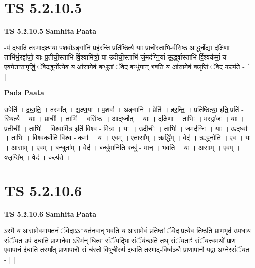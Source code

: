 \documentclass[17pt]{extarticle}
\begin{document}

\section{ TS 5.2.10.5 }

\textbf{TS 5.2.10.5 } \newline
\textbf{Samhita Paata} \newline

-प॑ दधाति॒ तस्मा॑दक्ष्ण॒या प॒शवोऽङ्गा॑नि॒ प्रह॑रन्ति॒ प्रति॑ष्ठित्यै॒ याः प्राची॒स्ताभि॒-र्वसि॑ष्ठ आर्द्ध्नो॒द्या द॑क्षि॒णा ताभि॑र्भ॒रद्वा॑जो॒ याः प्र॒तीची॒स्ताभि॑ र्वि॒श्वामि॑त्रो॒ या उदी॑ची॒स्ताभि॑-र्ज॒मद॑ग्नि॒र्या ऊ॒र्द्ध्वास्ताभि॑-र्वि॒श्वक॑र्मा॒ य ए॒वमे॒तासा॒मृद्धिं॒ ॅवेद॒र्द्ध्नोत्ये॒व य आ॑सामे॒वं ब॒न्धुतां॒ ॅवेद॒ बन्धु॑मान् भवति॒ य आ॑सामे॒वं क्लृप्तिं॒ ॅवेद॒ कल्प॑ते - [  ] \newline

\textbf{Pada Paata} \newline

उपेति॑ । द॒धा॒ति॒ । तस्मा᳚त् । अ॒क्ष्ण॒या । प॒शवः॑ । अङ्गा॑नि । प्रेति॑ । ह॒र॒न्ति॒ । प्रति॑ष्ठित्या॒ इति॒ प्रति॑ - स्थि॒त्यै॒ । याः । प्राचीः᳚ । ताभिः॑ । वसि॑ष्ठः । आ॒द्‌र्ध्नो॒त् । याः । द॒क्षि॒णा । ताभिः॑ । भ॒रद्वा॑जः । याः । प्र॒तीचीः᳚ । ताभिः॑ । वि॒श्वामि॑त्र॒ इति॑ वि॒श्व - मि॒त्रः॒ । याः । उदी॑चीः । ताभिः॑ । ज॒मद॑ग्निः । याः । ऊ॒द्‌र्ध्वाः । ताभिः॑ । वि॒श्वक॒र्मेति॑ वि॒श्व - क॒र्मा॒ । यः । ए॒वम् । ए॒तासा᳚म् । ऋद्धि᳚म् । वेद॑ । ऋ॒द्ध्नोति॑ । ए॒व । यः । आ॒सा॒म् । ए॒वम् । ब॒न्धुता᳚म् । वेद॑ । बन्धु॑मा॒निति॒ बन्धु॑ - मा॒न् । भ॒व॒ति॒ । यः । आ॒सा॒म् । ए॒वम् । क्लृप्ति᳚म् । वेद॑ । कल्प॑ते ।  \newline





\section{ TS 5.2.10.6 }

\textbf{TS 5.2.10.6 } \newline
\textbf{Samhita Paata} \newline

ऽस्मै॒ य आ॑सामे॒वमा॒यत॑नं॒ ॅवेदा॒ऽऽ*यत॑नवान् भवति॒ य आ॑सामे॒वं प्र॑ति॒ष्ठां ॅवेद॒ प्रत्ये॒व ति॑ष्ठति प्राण॒भृत॑ उप॒धाय॑ सं॒ॅयत॒ उप॑ दधाति प्रा॒णाने॒वा ऽस्मि॑न् धि॒त्वा सं॒ॅयद्भिः॒ संॅय॑च्छति॒ तथ् सं॒ॅयताꣳ॑ संॅय॒त्त्वमथो᳚ प्रा॒ण ए॒वापा॒नं द॑धाति॒ तस्मा᳚त् प्राणापा॒नौ सं च॑रतो॒ विषू॑ची॒रुप॑ दधाति॒ तस्मा॒द्-विष्व॑ञ्चौ प्राणापा॒नौ यद्वा अ॒ग्नेरसं॑ॅयत॒ - [  ] \newline
\end{document}
